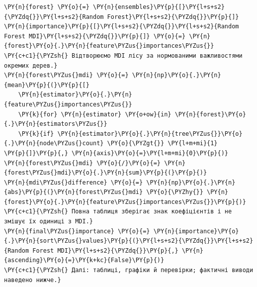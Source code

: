 \begin{Verbatim}[commandchars=\\\{\}]
\PY{n}{forest} \PY{o}{=} \PY{n}{ensembles}\PY{p}{[}\PY{l+s+s2}{\PYZdq{}}\PY{l+s+s2}{Random Forest}\PY{l+s+s2}{\PYZdq{}}\PY{p}{]}
\PY{n}{importance}\PY{p}{[}\PY{l+s+s2}{\PYZdq{}}\PY{l+s+s2}{Random Forest MDI}\PY{l+s+s2}{\PYZdq{}}\PY{p}{]} \PY{o}{=} \PY{n}{forest}\PY{o}{.}\PY{n}{feature\PYZus{}importances\PYZus{}}
\PY{c+c1}{\PYZsh{} Відтворюємо MDI лісу за нормованими важливостями окремих дерев.}
\PY{n}{forest\PYZus{}mdi} \PY{o}{=} \PY{n}{np}\PY{o}{.}\PY{n}{mean}\PY{p}{(}\PY{p}{[}
    \PY{n}{estimator}\PY{o}{.}\PY{n}{feature\PYZus{}importances\PYZus{}}
    \PY{k}{for} \PY{n}{estimator} \PY{o+ow}{in} \PY{n}{forest}\PY{o}{.}\PY{n}{estimators\PYZus{}}
    \PY{k}{if} \PY{n}{estimator}\PY{o}{.}\PY{n}{tree\PYZus{}}\PY{o}{.}\PY{n}{node\PYZus{}count} \PY{o}{\PYZgt{}} \PY{l+m+mi}{1}
\PY{p}{]}\PY{p}{,} \PY{n}{axis}\PY{o}{=}\PY{l+m+mi}{0}\PY{p}{)}
\PY{n}{forest\PYZus{}mdi} \PY{o}{/}\PY{o}{=} \PY{n}{forest\PYZus{}mdi}\PY{o}{.}\PY{n}{sum}\PY{p}{(}\PY{p}{)}
\PY{n}{mdi\PYZus{}difference} \PY{o}{=} \PY{n}{np}\PY{o}{.}\PY{n}{abs}\PY{p}{(}\PY{n}{forest\PYZus{}mdi} \PY{o}{\PYZhy{}} \PY{n}{forest}\PY{o}{.}\PY{n}{feature\PYZus{}importances\PYZus{}}\PY{p}{)}
\PY{c+c1}{\PYZsh{} Повна таблиця зберігає знак коефіцієнтів і не змішує їх одиниці з MDI.}
\PY{n}{final\PYZus{}importance} \PY{o}{=} \PY{n}{importance}\PY{o}{.}\PY{n}{sort\PYZus{}values}\PY{p}{(}\PY{l+s+s2}{\PYZdq{}}\PY{l+s+s2}{Random Forest MDI}\PY{l+s+s2}{\PYZdq{}}\PY{p}{,} \PY{n}{ascending}\PY{o}{=}\PY{k+kc}{False}\PY{p}{)}
\PY{c+c1}{\PYZsh{} Далі: таблиці, графіки й перевірки; фактичні виводи наведено нижче.}
\end{Verbatim}
